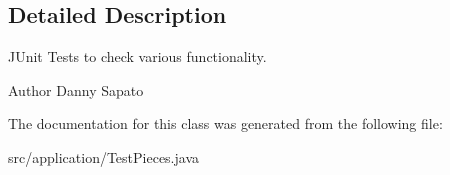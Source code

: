\subsection{Detailed Description}
J\+Unit Tests to check various functionality. 

\begin{DoxyAuthor}{Author}
Danny Sapato 
\end{DoxyAuthor}


The documentation for this class was generated from the following file\+:\begin{DoxyCompactItemize}
\item 
src/application/Test\+Pieces.\+java\end{DoxyCompactItemize}
